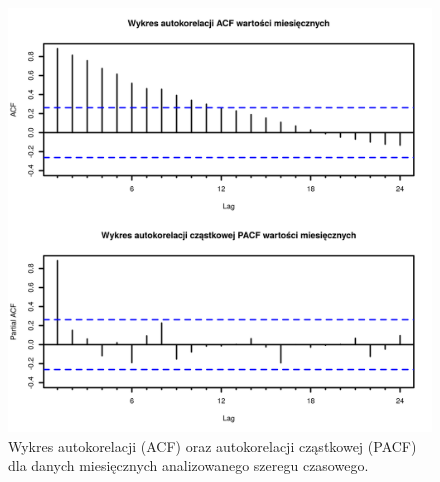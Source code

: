 \documentclass[11pt]{article}
\begin{document}
\begin{figure}[h]

    \centering
	\includegraphics[width=\textwidth]{images/data_monthly_train_wykres_autokorelacji_oraz_czastkowej.png}
    \caption{Wykres autokorelacji (ACF) oraz autokorelacji cząstkowej (PACF) dla danych miesięcznych analizowanego szeregu czasowego.}
    \label{fig:data_monthly_train_wykres_autokorelacji_oraz_czastkowej}

\end{figure}

\clearpage

\listoffigures

\clearpage

\listoftables
\end{document}
